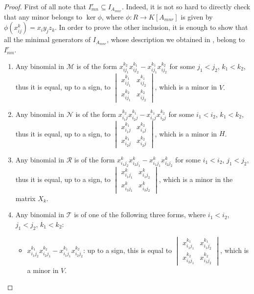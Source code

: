 \documentclass[10pt,a4paper]{amsart}
\begin{document}
  \begin{proof} 
   First of all note that $I_{mn}^r\subseteq I_{A_{mnr}}$. Indeed, it is not so hard to directly check that any minor belongs to $\ker \phi$, where $\phi: R\to K[A_{mnr}]$ is given by $\phi(x_{ij}^k)=x_iy_jz_k$. In order to prove the other inclusion, it is enough to show that all the minimal generators of $I_{A_{mnr}}$, whose description we obtained in , belong to $I_{mn}^r$.
   \begin{enumerate}
       \item Any binomial in $\mathcal M$ is of the form $x_{ij_1}^{k_2}x_{ij_2}^{k_1}-x_{ij_1}^{k_1}x_{ij_2}^{k_2}$ for some $j_1<j_2$, $k_1<k_2$, thus it is equal, up to a sign,  to  $\begin{vmatrix}
    x_{ij_1}^{k_1} & x_{ij_2}^{k_1} \\[1ex]
     x_{ij_1}^{k_2}   &x_{ij_2}^{k_2}
    \end{vmatrix}$, which is a minor in $V.$ 
\item Any binomial in $\mathcal N$ is of the form $x_{i_1j}^{k_2}x_{i_2j}^{k_1}-x_{i_1j}^{k_1}x_{i_2j}^{k_2}$ for some $i_1<i_2$, $k_1<k_2$, thus it is equal, up to a sign, to  $\begin{vmatrix}
    x_{i_1j}^{k_1} & x_{i_1j}^{k_2} \\[1ex]
     x_{i_2j}^{k_1}   &x_{i_2j}^{k_2}
    \end{vmatrix}$, which is a minor in $H$.
\item Any binomial in $\mathcal R$ is of the form $x_{i_1j_2}^{k}x_{i_2j_1}^{k}-x_{i_1j_1}^{k}x_{i_2j_2}^{k}$ for some $i_1<i_2$, $j_1<j_2$, thus it is equal, up to a sign, to $\begin{vmatrix}
    x_{i_1j_1}^{k} & x_{i_1j_2}^{k} \\[1ex]
     x_{i_2j_1}^{k} &x_{i_2j_2}^{k}
    \end{vmatrix}$, which is a minor in the matrix $X_k$.
    \item Any binomial in $\mathcal T$ is of one of the following three forms, where $i_1<i_2$, $j_1<j_2$, $k_1<k_2$:
    \begin{itemize}
        \item $x_{i_1j_2}^{k_1}x_{i_2j_1}^{k_2}-x_{i_1j_1}^{k_1}x_{i_2j_2}^{k_2}$: up to a sign, this is equal to $\begin{vmatrix}
    x_{i_1j_1}^{k_1} & x_{i_1j_2}^{k_1} \\[1ex]
     x_{i_2j_1}^{k_2}   &x_{i_2j_2}^{k_2}
    \end{vmatrix}$, which is a minor in $V$.

\end{itemize}
\end{enumerate}
\end{proof}
\end{document}
